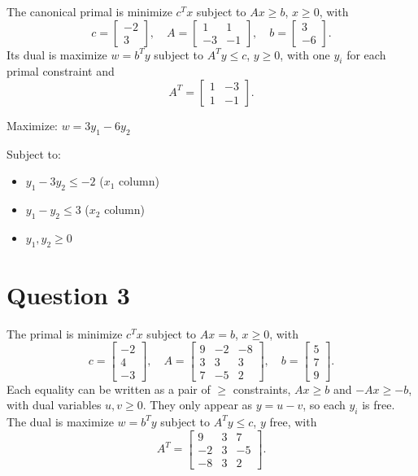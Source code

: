 \documentclass{article}
\begin{document}
The canonical primal is minimize $c^Tx$ subject to $Ax \ge b$, $x \ge 0$, with
\[
c = \begin{bmatrix} -2 \\ 3 \end{bmatrix}, \quad
A = \begin{bmatrix} 1 & 1 \\ -3 & -1 \end{bmatrix}, \quad
b = \begin{bmatrix} 3 \\ -6 \end{bmatrix}.
\]
Its dual is maximize $w = b^Ty$ subject to $A^Ty \le c$, $y \ge 0$, with one $y_i$ for each primal constraint and
\[
A^T = \begin{bmatrix} 1 & -3 \\ 1 & -1 \end{bmatrix}.
\]

Maximize: $w = 3y_1 - 6y_2$

Subject to:
\begin{itemize}
    \item $y_1 - 3y_2 \le -2$ ($x_1$ column)
    \item $y_1 - y_2 \le 3$ ($x_2$ column)
    \item $y_1, y_2 \ge 0$
\end{itemize}

\section*{Question 3}
The primal is minimize $c^Tx$ subject to $Ax = b$, $x \ge 0$, with
\[
c = \begin{bmatrix} -2 \\ 4 \\ -3 \end{bmatrix}, \quad
A = \begin{bmatrix} 9 & -2 & -8 \\ 3 & 3 & 3 \\ 7 & -5 & 2 \end{bmatrix}, \quad
b = \begin{bmatrix} 5 \\ 7 \\ 9 \end{bmatrix}.
\]
Each equality can be written as a pair of $\ge$ constraints, $Ax \ge b$ and $-Ax \ge -b$, with dual variables $u, v \ge 0$. They only appear as $y = u - v$, so each $y_i$ is free. The dual is maximize $w = b^Ty$ subject to $A^Ty \le c$, $y$ free, with
\[
A^T = \begin{bmatrix} 9 & 3 & 7 \\ -2 & 3 & -5 \\ -8 & 3 & 2 \end{bmatrix}.
\]
\end{document}
